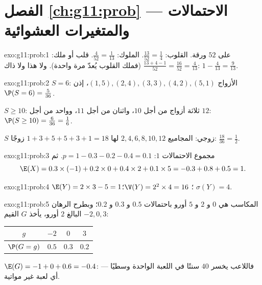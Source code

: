 \section*{الفصل \ref{ch:g11:prob} --- الاحتمالات والمتغيرات العشوائية}

\begin{solution}{exo:g11:prob:1}
 على $52$ ورقة. القلوب: $\frac{13}{52} = \frac14$. الملوك:
$\frac{4}{52} = \frac{1}{13}$. قلب أو ملك:
$\frac{13 + 4 - 1}{52} = \frac{16}{52} = \frac{4}{13}$ (فملك
القلوب يُعدّ مرة واحدة). ولا هذا ولا ذاك: $1 - \frac{4}{13} = \frac{9}{13}$.
\end{solution}

\begin{solution}{exo:g11:prob:2}
$S = 6$: الأزواج $(1,5), (2,4), (3,3), (4,2), (5,1)$، إذن
$\P(S = 6) = \frac{5}{36}$.

$S \geq 10$: ثلاثة أزواج من أجل $10$، واثنان من أجل $11$، وواحد من أجل $12$:
$\P(S \geq 10) = \frac{6}{36} = \frac16$.

$S$ زوجي: المجاميع $2, 4, 6, 8, 10, 12$ لها $1 + 3 + 5 + 5 + 3 + 1 = 18$
زوجًا:  $\frac{18}{36} = \frac12$.
\end{solution}

\begin{solution}{exo:g11:prob:3}
مجموع الاحتمالات $1$: $p = 1 - 0.3 - 0.2 - 0.4 = 0.1$. ثم
\[
\E(X) = 0.3 \times (-1) + 0.2 \times 0 + 0.4 \times 2 + 0.1 \times 5
= -0.3 + 0.8 + 0.5 = 1 .
\]
\end{solution}

\begin{solution}{exo:g11:prob:4}
$\E(Y) = 2 \times 3 - 5 = 1$؛ $\V(Y) = 2^2 \times 4 = 16$؛
$\sigma(Y) = 4$.
\end{solution}

\begin{solution}{exo:g11:prob:5}
المكاسب هي $0$ و $2$ و $5$ أورو باحتمالات $0.5$ و $0.3$
و $0.2$؛ وبطرح الرهان البالغ $2$ أورو، يأخذ $G$ القيم $-2, 0, 3$:
\begin{center}
\begin{tabular}{c|ccc}
$g$ & $-2$ & $0$ & $3$\\
\hline
$\P(G=g)$ & $0.5$ & $0.3$ & $0.2$
\end{tabular}
\end{center}
$\E(G) = -1 + 0 + 0.6 = -0.4$: فاللاعب يخسر $40$ سنتًا في اللعبة الواحدة
وسطيًا --- أي لعبة غير مواتية.
\end{solution}

